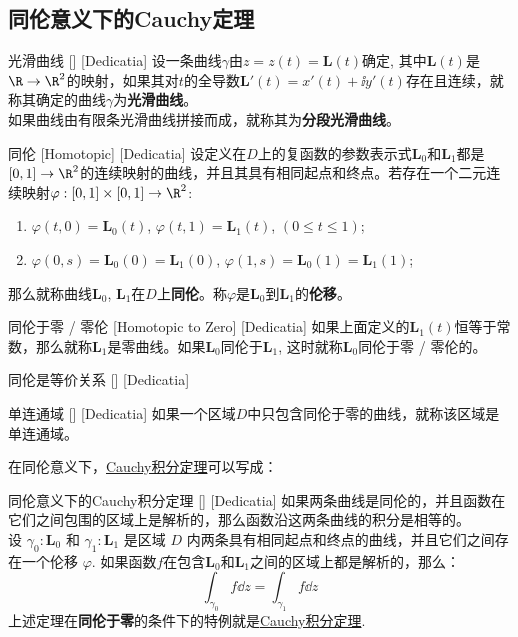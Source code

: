 \documentclass[UTF8]{ctexart}
\newcommand{\CauchyThm}{\hyperref[thm:Cauchy]{Cauchy积分定理}}
\begin{document}
\subsection{同伦意义下的Cauchy定理}
\begin{dfn}
    [UUID]
    {光滑曲线}
    []
    [Dedicatia]
    设一条曲线$\gamma$由$z=z(t)=\bm{L}(t)$确定, 其中$\bm{L}(t)$是$\R\to\R^2$的映射，如果其对$t$的全导数$\bm{L}'(t)=x'(t)+\ii y'(t)$存在且连续，就称其确定的曲线$\gamma$为\textbf{光滑曲线}。\\
    如果曲线由有限条光滑曲线拼接而成，就称其为\textbf{分段光滑曲线}。
\end{dfn}
\begin{dfn}
    [UUID]
    {同伦}
    [Homotopic]
    [Dedicatia]
    设定义在$D$上的复函数的参数表示式$\bm{L}_0$和$\bm{L}_1$都是$[0,1]\to\R^2$的连续映射的曲线，并且其具有相同起点和终点。若存在一个二元连续映射$\varphi:[0,1]\times[0,1]\to\R^2$:
    \begin{enumerate}
        \item $\varphi(t,0)=\bm{L}_0(t)$, $\varphi(t,1)=\bm{L}_1(t)$, $(0\leq t\leq 1)$;
        \item $\varphi(0,s)=\bm{L}_0(0)=\bm{L}_1(0)$, $\varphi(1,s)=\bm{L}_0(1)=\bm{L}_1(1)$;
    \end{enumerate}
    那么就称曲线$\bm{L}_0$, $\bm{L}_1$在$D$上\textbf{同伦}。称$\varphi$是$\bm{L}_0$到$\bm{L}_1$的\textbf{伦移}。
\end{dfn}
\begin{dfn}
    [UUID]
    {同伦于零 / 零伦}
    [Homotopic to Zero]
    [Dedicatia]
    如果上面定义的$\bm{L}_1(t)$恒等于常数，那么就称$\bm{L}_1$是零曲线。如果$\bm{L}_0$同伦于$\bm{L}_1$, 这时就称$\bm{L}_0$同伦于零 / 零伦的。
\end{dfn}
\begin{ppt}
    [UUID]
    {同伦是等价关系}
    []
    [Dedicatia]
\end{ppt}
\begin{dfn}
    [UUID]
    {单连通域}
    []
    [Dedicatia]
    如果一个区域$D$中只包含同伦于零的曲线，就称该区域是单连通域。
\end{dfn}
在同伦意义下，\CauchyThm 可以写成：
\begin{thm}
    [UUID]
    {同伦意义下的Cauchy积分定理}
    []
    [Dedicatia]
    如果两条曲线是同伦的，并且函数在它们之间包围的区域上是解析的，那么函数沿这两条曲线的积分是相等的。\\
    设 $\gamma_0:\bm{L}_0$ 和 $\gamma_1:\bm{L}_1$ 是区域 $D$ 内两条具有相同起点和终点的曲线，并且它们之间存在一个伦移 $\varphi$. 如果函数$f$在包含$\bm{L}_0$和$\bm{L}_1$之间的区域上都是解析的，那么：
    \[\int_{\gamma_0}f\dd{z}=\int_{\gamma_1}f\dd{z}\]
    上述定理在\textbf{同伦于零}的条件下的特例就是\CauchyThm .
\end{thm}
\end{document}
